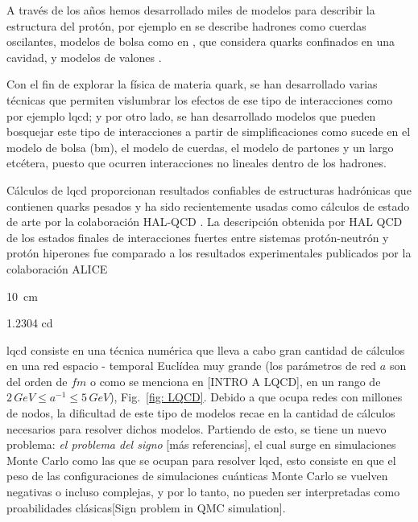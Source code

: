 A través de los años hemos desarrollado miles de modelos para describir la estructura del protón, por ejemplo en \cite{Artru1974, Andersson_1983} se describe hadrones como cuerdas oscilantes, modelos de bolsa como en \cite{AIHPA_1968__8_2_163_0,DeTar_1983}, que considera quarks confinados en una cavidad, y modelos de valones \cite{Hwa_1981}.

Con el fin de explorar la física de materia quark, se han desarrollado varias técnicas que permiten vislumbrar los efectos de ese tipo de interacciones como por ejemplo \acrfull{lqcd}; y por otro lado, se han desarrollado modelos que pueden bosquejar este tipo de interacciones a partir de simplificaciones como sucede en el modelo de bolsa (\acrfull{bm}), el modelo de cuerdas, el modelo de partones y un largo etcétera\cite{DeTar_1983}, puesto que ocurren interacciones no lineales dentro de los hadrones. 


Cálculos de \acrshort{lqcd} proporcionan resultados confiables de estructuras hadrónicas que contienen quarks pesados y ha sido recientemente usadas como cálculos de estado de arte por la colaboración HAL-QCD \cite{Iritani_2019,Hatsuda_2017}. La descripción obtenida por HAL QCD de los estados finales de interacciones fuertes entre sistemas protón-neutrón y protón hiperones fue comparado a los resultados experimentales publicados por la colaboración ALICE \cite{Collaboration2020, Collaboration2021}

\qty{10}{cm}

\num{1.2304} \unit{\candela}

\acrshort{lqcd} consiste en una técnica numérica que lleva a cabo gran cantidad de cálculos en una red espacio - temporal Euclídea muy grande (los parámetros de red $a$ son del orden de $\mathit{\unit{\femto\meter}}$ o como se menciona en [INTRO A LQCD], en un rango de $2 \, \unit{GeV} \leq {a}^{-1} \leq 5 \, \unit{GeV}$), Fig.~\ref{fig: LQCD}. Debido a que ocupa redes con millones de nodos, la dificultad de este tipo de modelos recae en la cantidad de cálculos necesarios para resolver dichos modelos. 
Partiendo de esto, se tiene un nuevo problema: \emph{el problema del signo} [más referencias], el cual surge en simulaciones Monte Carlo como las que se ocupan para resolver \acrshort{lqcd}, esto consiste en que el peso de las configuraciones de simulaciones cuánticas Monte Carlo se vuelven negativas o incluso complejas, y por lo tanto, no pueden ser interpretadas como proabilidades clásicas[Sign problem in QMC simulation]. 

